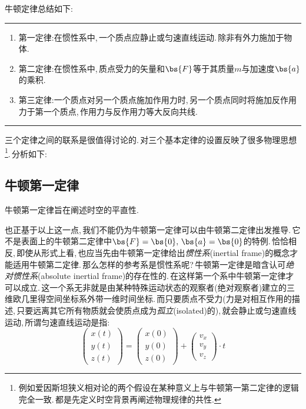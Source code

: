 牛顿定律总结如下:
\vspace{0.5cm}

\hrule
\begin{enumerate}
	\item 第一定律:\quad 在惯性系中,\,一个质点应静止或匀速直线运动.\,除非有外力施加于物体.
	\item 第二定律:\quad 在惯性系中,\,质点受力的矢量和$\bs{F}$等于其质量$m$与加速度$\bs{a}$的乘积.
	\item 第三定律:\quad 一个质点对另一个质点施加作用力时,\,另一个质点同时将施加反作用力于第一个质点,\,作用力与反作用力等大反向共线.
\end{enumerate}
\hrule
\vspace{0.5cm}

三个定律之间的联系是很值得讨论的.\,对三个基本定律的设置反映了很多物理思想\footnote{例如爱因斯坦狭义相对论的两个假设在某种意义上与牛顿第一第二定律的逻辑完全一致.\,都是先定义时空背景再阐述物理规律的共性.}.\,分析如下:

\subsection{牛顿第一定律}
牛顿第一定律旨在阐述时空的平直性.

也正基于以上这一点,\,我们不能仍为牛顿第一定律可以由牛顿第二定律出发推导.\,它不是表面上的牛顿第二定律中$\bs{F}=\bs{0},\,\bs{a}=\bs{0}$的特例.\,恰恰相反,\,即使从形式上看,\,也应当先由牛顿第一定律给出\emph{惯性系}(inertial frame)的概念才能适用牛顿第二定律.\,那么怎样的参考系是惯性系呢?\,牛顿第一定律是暗含认可\emph{绝对惯性系}(absolute inertial frame)的存在性的.\,在这样第一个系中牛顿第一定律才可以成立.\,这一个系无非就是由某种特殊运动状态的观察者(绝对观察者)建立的三维欧几里得空间坐标系外带一维时间坐标.\,而只要质点不受力(力是对相互作用的描述,\,只要远离其它所有物质就会使质点成为\emph{孤立}(isolated)的),\,就会静止或匀速直线运动,\,所谓匀速直线运动是指:
\[\begin{pmatrix}x(t)\\y(t)\\z(t)\end{pmatrix}=\begin{pmatrix}x(0)\\y(0)\\z(0)\end{pmatrix}+\begin{pmatrix}v_x\\v_y\\v_z\end{pmatrix}\cdot t\]

